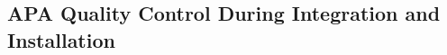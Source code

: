 \subsection{APA Quality Control During Integration and Installation} %
\label{sec:fdsp-apa-transport-qc}


